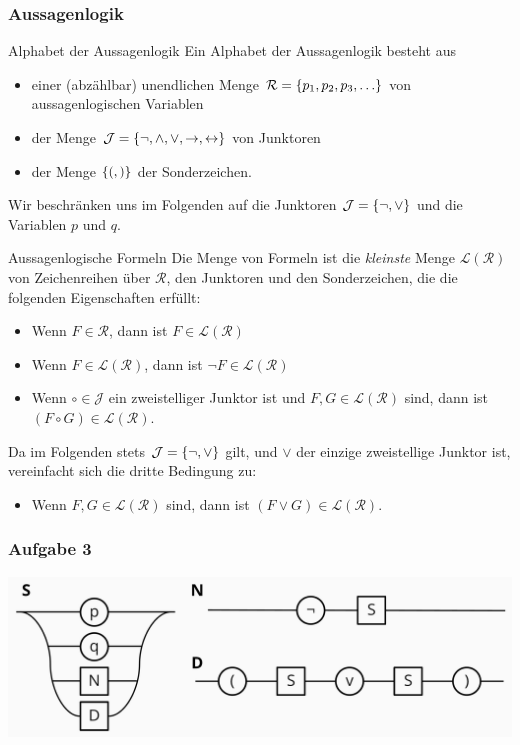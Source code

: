 \documentclass{beamer}
\begin{document}
\begin{frame} \frametitle{Aussagenlogik}
	\begin{block}{Alphabet der Aussagenlogik}
		Ein Alphabet der Aussagenlogik besteht aus
		\begin{itemize}
			\item einer (abzählbar) unendlichen Menge $\mathcal{R} = \menge{p_1,p_2,p_3, \dots}$ von aussagenlogischen Variablen
			\item der Menge $\mathcal{J} = \left\{ \lnot, \land, \lor, \to, \leftrightarrow \right\}$ von Junktoren
			\item der Menge $\left\{ (,) \right\}$ der Sonderzeichen.
		\end{itemize}
	\end{block}
	Wir beschränken uns im Folgenden auf die Junktoren $\mathcal{J} = \left\{ \lnot, \lor \right\}$ und die Variablen $p$ und $q$.
\end{frame}

\begin{frame}%
	\begin{block}{Aussagenlogische Formeln}
		Die Menge von Formeln ist die \emph{kleinste} Menge $\mathcal{L}(\mathcal{R})$ von Zeichenreihen über $\mathcal{R}$, den Junktoren und den Sonderzeichen, die die folgenden Eigenschaften erfüllt:
		\begin{itemize}
			\item Wenn $F \in \mathcal{R}$, dann ist $F \in \mathcal{L}(\mathcal{R})$
			\item Wenn $F \in \mathcal{L}(\mathcal{R})$, dann ist $\lnot F \in \mathcal{L}(\mathcal{R})$
			\item Wenn $\circ \in \mathcal{J}$ ein zweistelliger Junktor ist und $F,G \in \mathcal{L}(\mathcal{R})$ sind, dann ist $(F \circ G) \in \mathcal{L}(\mathcal{R})$.
		\end{itemize}
	
		Da im Folgenden stets $\mathcal{J} = \left\{ \lnot, \lor \right\}$ gilt, und $\lor$ der einzige zweistellige Junktor ist, vereinfacht sich die dritte Bedingung zu:
		\begin{itemize}
			\item Wenn $F,G \in \mathcal{L}(\mathcal{R})$ sind, dann ist $(F \lor G) \in \mathcal{L}(\mathcal{R})$.
		\end{itemize}
	\end{block}
\end{frame}

\begin{frame} \frametitle{Aufgabe 3}
	\centering
	\includegraphics[width=\textwidth]{tut02_syntax_dia_3.jpg}
\end{frame}
\end{document}
